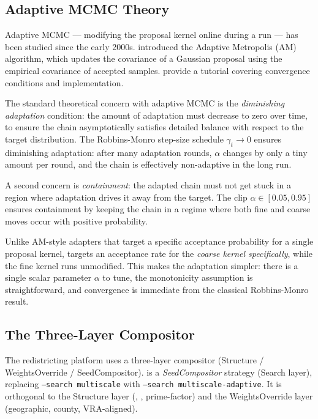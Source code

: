 \subsection{Adaptive MCMC Theory}

Adaptive MCMC --- modifying the proposal kernel online during a run ---
has been studied since the early 2000s.
\citet{haario2001} introduced the Adaptive Metropolis (AM) algorithm, which
updates the covariance of a Gaussian proposal using the empirical covariance
of accepted samples.
\citet{andrieu2008} provide a tutorial covering convergence conditions and
implementation.

The standard theoretical concern with adaptive MCMC is the \emph{diminishing
adaptation} condition: the amount of adaptation must decrease to zero over
time, to ensure the chain asymptotically satisfies detailed balance with
respect to the target distribution.
The Robbins-Monro step-size schedule $\gamma_t \to 0$ ensures diminishing
adaptation: after many adaptation rounds, $\alpha$ changes by only a tiny
amount per round, and the chain is effectively non-adaptive in the long run.

A second concern is \emph{containment}: the adapted chain must not get stuck
in a region where adaptation drives it away from the target.
The clip $\alpha \in [0.05, 0.95]$ ensures containment by keeping the chain
in a regime where both fine and coarse moves occur with positive probability.

Unlike AM-style adapters that target a specific acceptance probability for a
single proposal kernel, \ams{} targets an acceptance rate for the
\emph{coarse kernel specifically}, while the fine kernel runs unmodified.
This makes the adaptation simpler: there is a single scalar parameter $\alpha$
to tune, the monotonicity assumption is straightforward, and convergence is
immediate from the classical Robbins-Monro result.

\subsection{The Three-Layer Compositor}

The redistricting platform uses a three-layer compositor
(Structure / WeightsOverride / SeedCompositor).
\ams{} is a \emph{SeedCompositor} strategy (Search layer), replacing
\texttt{--search multiscale} with \texttt{--search multiscale-adaptive}.
It is orthogonal to the Structure layer (\geosec{}, \areasec{}, prime-factor)
and the WeightsOverride layer (geographic, county, VRA-aligned).
